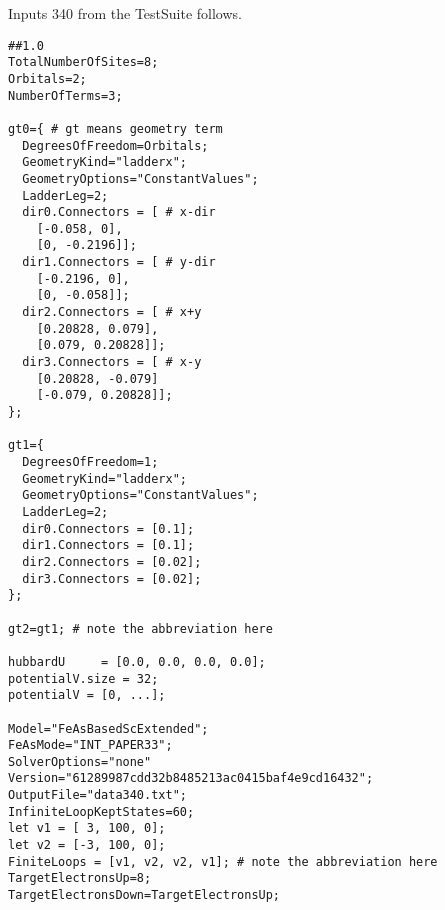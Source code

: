 \documentclass[twocolumn]{article}
\begin{document}
Inputs 340 from the TestSuite follows.
\begin{tiny}
\begin{verbatim}
##1.0
TotalNumberOfSites=8;
Orbitals=2;
NumberOfTerms=3;

gt0={ # gt means geometry term
  DegreesOfFreedom=Orbitals;
  GeometryKind="ladderx";
  GeometryOptions="ConstantValues";
  LadderLeg=2;
  dir0.Connectors = [ # x-dir
    [-0.058, 0],
    [0, -0.2196]];
  dir1.Connectors = [ # y-dir
    [-0.2196, 0],
    [0, -0.058]];
  dir2.Connectors = [ # x+y
    [0.20828, 0.079],
    [0.079, 0.20828]];
  dir3.Connectors = [ # x-y
    [0.20828, -0.079]
    [-0.079, 0.20828]];
};

gt1={
  DegreesOfFreedom=1;
  GeometryKind="ladderx";
  GeometryOptions="ConstantValues";
  LadderLeg=2;
  dir0.Connectors = [0.1];
  dir1.Connectors = [0.1];
  dir2.Connectors = [0.02];
  dir3.Connectors = [0.02]; 
};

gt2=gt1; # note the abbreviation here

hubbardU	 = [0.0, 0.0, 0.0, 0.0]; 
potentialV.size = 32;
potentialV = [0, ...];

Model="FeAsBasedScExtended";
FeAsMode="INT_PAPER33";
SolverOptions="none"
Version="61289987cdd32b8485213ac0415baf4e9cd16432";
OutputFile="data340.txt";
InfiniteLoopKeptStates=60;
let v1 = [ 3, 100, 0];
let v2 = [-3, 100, 0];
FiniteLoops = [v1, v2, v2, v1]; # note the abbreviation here
TargetElectronsUp=8;
TargetElectronsDown=TargetElectronsUp;
\end{verbatim}
\end{tiny}
\end{document}
